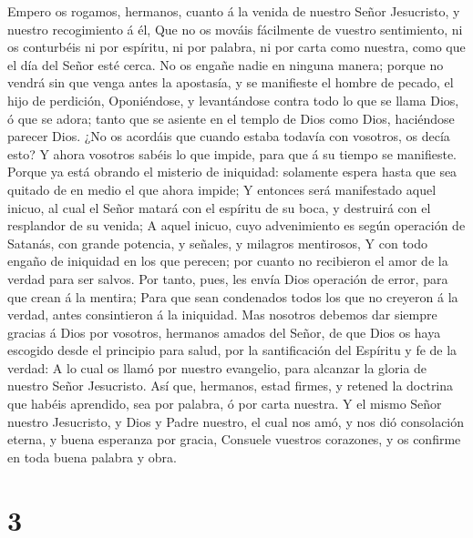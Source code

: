  Empero os rogamos, hermanos, cuanto á la venida de nuestro
Señor Jesucristo, y nuestro recogimiento á él,  Que no os
mováis fácilmente de vuestro sentimiento, ni os conturbéis ni por
espíritu, ni por palabra, ni por carta como nuestra, como que el día del
Señor esté cerca.  No os engañe nadie en ninguna manera;
porque no vendrá sin que venga antes la apostasía, y se manifieste el
hombre de pecado, el hijo de perdición,  Oponiéndose, y
levantándose contra todo lo que se llama Dios, ó que se adora; tanto que
se asiente en el templo de Dios como Dios, haciéndose parecer Dios.
 ¿No os acordáis que cuando estaba todavía con vosotros, os
decía esto?  Y ahora vosotros sabéis lo que impide, para que
á su tiempo se manifieste.  Porque ya está obrando el
misterio de iniquidad: solamente espera hasta que sea quitado de en
medio el que ahora impide;  Y entonces será manifestado
aquel inicuo, al cual el Señor matará con el espíritu de su boca, y
destruirá con el resplandor de su venida;  A aquel inicuo,
cuyo advenimiento es según operación de Satanás, con grande potencia, y
señales, y milagros mentirosos,  Y con todo engaño de
iniquidad en los que perecen; por cuanto no recibieron el amor de la
verdad para ser salvos.  Por tanto, pues, les envía Dios
operación de error, para que crean á la mentira;  Para que
sean condenados todos los que no creyeron á la verdad, antes
consintieron á la iniquidad.  Mas nosotros debemos dar
siempre gracias á Dios por vosotros, hermanos amados del Señor, de que
Dios os haya escogido desde el principio para salud, por la
santificación del Espíritu y fe de la verdad:  A lo cual os
llamó por nuestro evangelio, para alcanzar la gloria de nuestro Señor
Jesucristo.  Así que, hermanos, estad firmes, y retened la
doctrina que habéis aprendido, sea por palabra, ó por carta nuestra.
 Y el mismo Señor nuestro Jesucristo, y Dios y Padre
nuestro, el cual nos amó, y nos dió consolación eterna, y buena
esperanza por gracia,  Consuele vuestros corazones, y os
confirme en toda buena palabra y obra.

\hypertarget{section-2}{%
\section{3}\label{section-2}}

